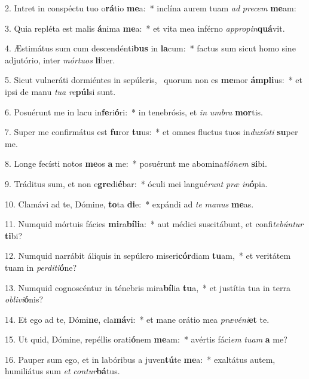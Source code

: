 2. Intret in conspéctu tuo o\textbf{rá}tio \textbf{me}a:~*  inclína aurem tuam \textit{ad} \textit{pre}\textit{cem} \textbf{me}am:\

3. Quia repléta est malis \textbf{á}nima \textbf{me}a:~*  et vita mea inférno \textit{ap}\textit{pro}\textit{pin}\textbf{quá}vit.\

4. Æstimátus sum cum descendénti\textbf{bus} in \textbf{la}cum:~*  factus sum sicut homo sine adjutório, inter \textit{mór}\textit{tu}\textit{os} \textbf{li}ber.\

5. Sicut vulneráti dormiéntes in sepúlcris, \dag\  quorum non es \textbf{me}mor \textbf{ám}\textbf{pli}us:~*  et ipsi de manu \textit{tu}\textit{a} \textit{re}\textbf{púl}si sunt.\

6. Posuérunt me in lacu in\textbf{fe}ri\textbf{ó}ri:~*  in tenebrósis, et \textit{in} \textit{um}\textit{bra} \textbf{mor}tis.\

7. Super me confirmátus est \textbf{fu}ror \textbf{tu}us:~*  et omnes fluctus tuos in\textit{du}\textit{xís}\textit{ti} \textbf{su}per me.\

8. Longe fecísti notos \textbf{me}os \textbf{a} me:~*  posuérunt me abomina\textit{ti}\textit{ó}\textit{nem} \textbf{si}bi.\

9. Tráditus sum, et non e\textbf{gre}di\textbf{é}bar:~*  óculi mei langué\textit{runt} \textit{præ} \textit{in}\textbf{ó}pia.\

10. Clamávi ad te, Dómine, \textbf{to}ta \textbf{di}e:~*  expándi ad \textit{te} \textit{ma}\textit{nus} \textbf{me}as.\

11. Numquid mórtuis fácies \textbf{mi}ra\textbf{bí}\textbf{li}a:~*  aut médici suscitábunt, et confi\textit{te}\textit{bún}\textit{tur} \textbf{ti}bi?\

12. Numquid narrábit áliquis in sepúlcro miseri\textbf{cór}diam \textbf{tu}am,~*  et veritátem tuam in \textit{per}\textit{di}\textit{ti}\textbf{ó}ne?\

13. Numquid cognoscéntur in ténebris mira\textbf{bí}lia \textbf{tu}a,~*  et justítia tua in terra \textit{ob}\textit{li}\textit{vi}\textbf{ó}nis?\

14. Et ego ad te, Dómi\textbf{ne}, cla\textbf{má}vi:~*  et mane orátio mea \textit{præ}\textit{vé}\textit{ni}\textbf{et} te.\

15. Ut quid, Dómine, repéllis orati\textbf{ó}nem \textbf{me}am:~*  avértis fáci\textit{em} \textit{tu}\textit{am} \textbf{a} me?\

16. Pauper sum ego, et in labóribus a juven\textbf{tú}te \textbf{me}a:~*  exaltátus autem, humiliátus sum \textit{et} \textit{con}\textit{tur}\textbf{bá}tus.\

